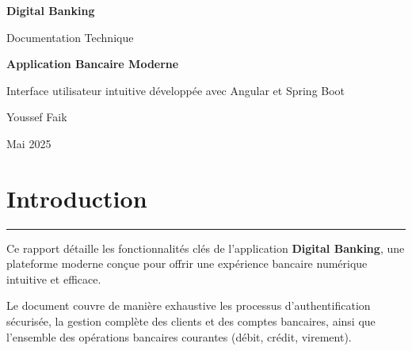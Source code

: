 \documentclass[11pt, a4paper]{article}
\newcommand{\accentline}{\textcolor{accent}{\rule{\textwidth}{1pt}}}
\begin{document}
\begin{titlepage}
    \centering
    \vspace*{3cm}
    
    {\Huge\bfseries\color{primary}Digital Banking\par}
    \vspace{1cm}
    {\Large\color{text}Documentation Technique\par}
    
    \vspace{4cm}
    
    \begin{center}
    \colorbox{light}{%
        \begin{minipage}{0.7\textwidth}
            \centering
            \vspace{1cm}
            {\large\bfseries\color{primary}Application Bancaire Moderne\par}
            \vspace{0.5cm}
            {\color{text}Interface utilisateur intuitive développée avec Angular et Spring Boot\par}
            \vspace{1cm}
        \end{minipage}
    }
    \end{center}
    
    \vfill
    
    {\large\color{text}Youssef Faik\par}
    \vspace{0.3cm}
    {\color{text}Mai 2025\par}
    
\end{titlepage}

\newpage
\thispagestyle{fancy}
\tableofcontents

\newpage

\section{Introduction}
\accentline

Ce rapport détaille les fonctionnalités clés de l'application \textbf{Digital Banking}, une plateforme moderne conçue pour offrir une expérience bancaire numérique intuitive et efficace.

Le document couvre de manière exhaustive les processus d'authentification sécurisée, la gestion complète des clients et des comptes bancaires, ainsi que l'ensemble des opérations bancaires courantes (débit, crédit, virement).
\end{document}
